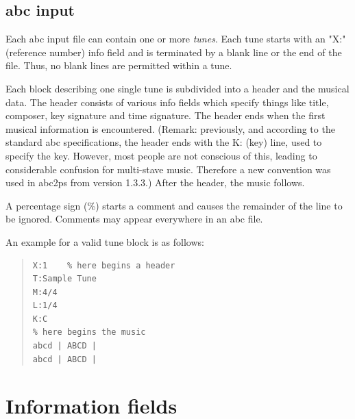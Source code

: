\documentclass[a4paper]{article}
\begin{document}
\subsection{abc input}
Each abc input file can contain one or more {\it tunes}. Each tune
starts with an "X:" (reference number) info field and is terminated by a 
blank line or the end of the file. Thus, no blank lines are permitted 
within a tune.
\par
Each block describing one single tune is subdivided into a header and the
musical data. The header consists of various info fields which specify
things like title, composer, key signature and time signature.
The header ends when the first musical information is encountered.
(Remark: previously, and according to the standard abc specifications, the
header ends with the K: (key) line, used to specify the key. However, most
people are not conscious of this, leading to considerable confusion
for multi-stave music. Therefore a new convention was used in abc2ps from
version 1.3.3.)
After the header, the music follows.
\par
{}
A percentage sign (\%) starts a comment and causes the 
remainder of the line to be ignored. Comments may appear everywhere in 
an abc file.
\par
An example for a valid tune block is as follows:

\begin{quote}
\begin{verbatim}
X:1    % here begins a header
T:Sample Tune
M:4/4
L:1/4
K:C
% here begins the music
abcd | ABCD |
abcd | ABCD |
\end{verbatim}
\end{quote}

\section{Information fields}
\end{document}
